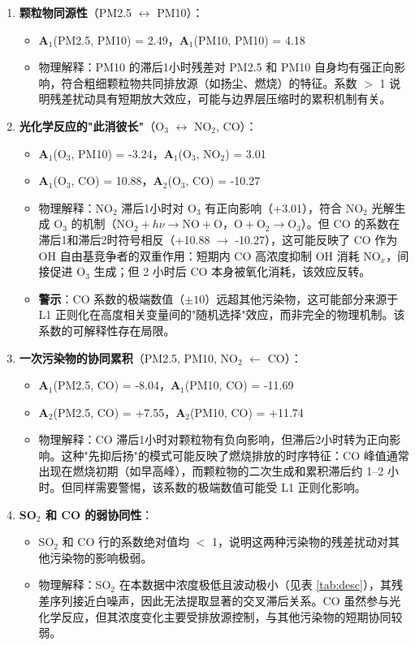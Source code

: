 \documentclass[UTF8,a4paper,12pt]{ctexart}
\begin{document}
\begin{enumerate}[nosep,leftmargin=2em]
\item \textbf{颗粒物同源性}（PM2.5 $\leftrightarrow$ PM10）：
  \begin{itemize}[nosep]
    \item $\mathbf{A}_1$(PM2.5, PM10) = 2.49，$\mathbf{A}_1$(PM10, PM10) = 4.18
    \item 物理解释：PM10 的滞后1小时残差对 PM2.5 和 PM10 自身均有强正向影响，符合粗细颗粒物共同排放源（如扬尘、燃烧）的特征。系数 $>$ 1 说明残差扰动具有短期放大效应，可能与边界层压缩时的累积机制有关。
  \end{itemize}

\item \textbf{光化学反应的"此消彼长"}（O$_3$ $\leftrightarrow$ NO$_2$, CO）：
  \begin{itemize}[nosep]
    \item $\mathbf{A}_1$(O$_3$, PM10) = -3.24，$\mathbf{A}_1$(O$_3$, NO$_2$) = 3.01
    \item $\mathbf{A}_1$(O$_3$, CO) = 10.88，$\mathbf{A}_2$(O$_3$, CO) = -10.27
    \item 物理解释：NO$_2$ 滞后1小时对 O$_3$ 有正向影响（+3.01），符合 NO$_2$ 光解生成 O$_3$ 的机制（$\text{NO}_2+h\nu\to\text{NO}+\text{O}$，$\text{O}+\text{O}_2\to\text{O}_3$）。但 CO 的系数在滞后1和滞后2时符号相反（+10.88 $\to$ -10.27），这可能反映了 CO 作为 OH 自由基竞争者的双重作用：短期内 CO 高浓度抑制 OH 消耗 NO$_x$，间接促进 O$_3$ 生成；但 2 小时后 CO 本身被氧化消耗，该效应反转。
    \item \textbf{警示}：CO 系数的极端数值（$\pm 10$）远超其他污染物，这可能部分来源于 L1 正则化在高度相关变量间的"随机选择"效应，而非完全的物理机制。该系数的可解释性存在局限。
  \end{itemize}

\item \textbf{一次污染物的协同累积}（PM2.5, PM10, NO$_2$ $\leftarrow$ CO）：
  \begin{itemize}[nosep]
    \item $\mathbf{A}_1$(PM2.5, CO) = -8.04，$\mathbf{A}_1$(PM10, CO) = -11.69
    \item $\mathbf{A}_2$(PM2.5, CO) = +7.55，$\mathbf{A}_2$(PM10, CO) = +11.74
    \item 物理解释：CO 滞后1小时对颗粒物有负向影响，但滞后2小时转为正向影响。这种"先抑后扬"的模式可能反映了燃烧排放的时序特征：CO 峰值通常出现在燃烧初期（如早高峰），而颗粒物的二次生成和累积滞后约 1--2 小时。但同样需要警惕，该系数的极端数值可能受 L1 正则化影响。
  \end{itemize}

\item \textbf{SO$_2$ 和 CO 的弱协同性}：
  \begin{itemize}[nosep]
    \item SO$_2$ 和 CO 行的系数绝对值均 $<$ 1，说明这两种污染物的残差扰动对其他污染物的影响极弱。
    \item 物理解释：SO$_2$ 在本数据中浓度极低且波动极小（见表 \ref{tab:desc}），其残差序列接近白噪声，因此无法提取显著的交叉滞后关系。CO 虽然参与光化学反应，但其浓度变化主要受排放源控制，与其他污染物的短期协同较弱。
  \end{itemize}
\end{enumerate}
\end{document}
